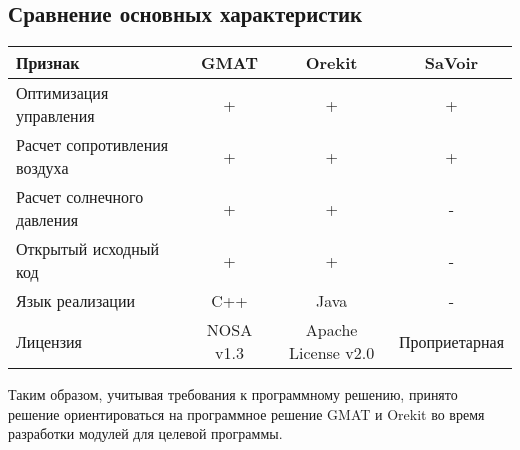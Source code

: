 \subsection{Сравнение основных характеристик}
\begin{tabular}{|l|c|c|c|}
  \hline
  Признак                      & GMAT                            & Orekit              & SaVoir \\ \hline
  Оптимизация управления       & +                               & +                   & +      \\ \hline
  Расчет сопротивления воздуха & +                               & +                   & +      \\ \hline
  Расчет солнечного давления   & +                               & +                   & -      \\ \hline
  Открытый исходный код        & +                               & +                   & -      \\ \hline
  Язык реализации              & C++                             & Java                & -      \\ \hline
  Лицензия                     & NOSA v1.3 & Apache License v2.0 & Проприетарная \\ \hline
\end{tabular}\par
Таким образом, учитывая требования к программному решению, принято решение
ориентироваться на программное решение GMAT и Orekit во время разработки модулей
для целевой программы.

